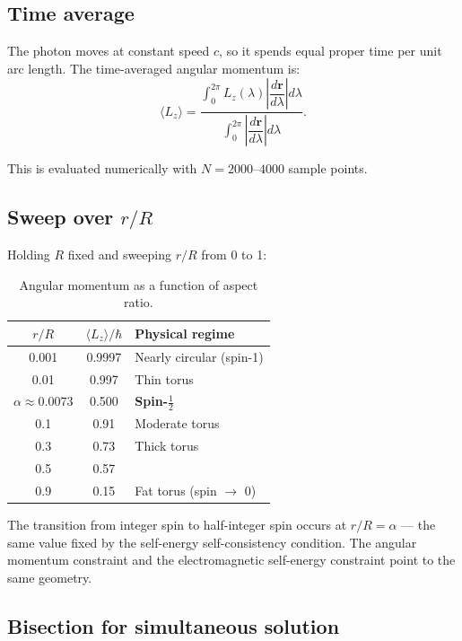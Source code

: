 \documentclass[11pt,a4paper]{article}
\begin{document}
\subsection{Time average}

The photon moves at constant speed $c$, so it spends equal proper time per unit arc length. The time-averaged angular momentum is:
\begin{equation}
  \langle L_z \rangle = \frac{\int_0^{2\pi} L_z(\lambda)\left|\dfrac{d\mathbf{r}}{d\lambda}\right| d\lambda}{\int_0^{2\pi}\left|\dfrac{d\mathbf{r}}{d\lambda}\right| d\lambda}.
\end{equation}

This is evaluated numerically with $N = 2000$--$4000$ sample points.

\subsection{Sweep over \texorpdfstring{$r/R$}{r/R}}

Holding $R$ fixed and sweeping $r/R$ from 0 to 1:

\begin{table}[h]
\centering
\begin{tabular}{@{}ccl@{}}
\toprule
$r/R$ & $\langle L_z \rangle / \hbar$ & Physical regime \\
\midrule
0.001 & 0.9997 & Nearly circular (spin-1) \\
0.01 & 0.997 & Thin torus \\
$\alpha \approx 0.0073$ & 0.500 & \textbf{Spin-$\frac{1}{2}$} \\
0.1 & 0.91 & Moderate torus \\
0.3 & 0.73 & Thick torus \\
0.5 & 0.57 & \\
0.9 & 0.15 & Fat torus (spin $\to$ 0) \\
\bottomrule
\end{tabular}
\caption{Angular momentum as a function of aspect ratio.}
\label{tab:angular-momentum}
\end{table}

The transition from integer spin to half-integer spin occurs at $r/R = \alpha$ --- the same value fixed by the self-energy self-consistency condition. The angular momentum constraint and the electromagnetic self-energy constraint point to the same geometry.

\subsection{Bisection for simultaneous solution}
\end{document}
